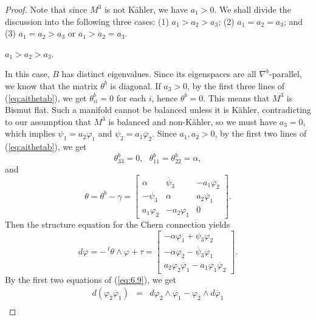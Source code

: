 \documentclass{amsart}
\numberwithin{equation}{section}
\theoremstyle{definition}
\renewcommand{\1}{\mathds{1}}
\renewcommand{\>}{\rightarrow}
\begin{document}
\begin{proof}  Note that  since $M^3$ is not K\"ahler, we have $a_1>0$.
We shall divide the discussion into the following three cases: (1) $a_1>a_2>a_3$; (2) $a_1=a_2=a_3$; and (3) $a_1=a_2>a_3$ or $a_1>a_2=a_3$.

\vspace{0.15cm}

 $a_1>a_2>a_3$.

\vspace{0.1cm}

In this case, $B$ has distinct eigenvalues. Since its eigenspaces are all $\nabla^b$-parallel, we know that the matrix $\theta^b$ is diagonal.
If $a_3>0$, by the first three lines of (\ref{eq:aithetab}), we get $\theta^b_{ii}=0$ for each $i$, hence $\theta^b=0$. This means that $M^3$ is Bismut flat. Such a manifold cannot be balanced unless it is K\"ahler, contradicting to our assumption that $M^3$ is balanced and non-K\"ahler, so we must have $a_3=0$, which implies $\psi_1=a_2\varphi_1$ and $\psi_2=a_1\overline{\varphi}_2$. Since $a_1, a_2>0$, by the first two lines of (\ref{eq:aithetab}), we get
\begin{equation*}
 \theta^b_{33}=0, \ \ \  \theta^b_{11}=\theta^b_{22} = \alpha ,
\end{equation*}
and
$$ \theta = \theta^b-\gamma =  \begin{bmatrix} \alpha  & \overline{\psi}_3 & -a_1\overline{\varphi}_2 \\ -\psi_3 & \alpha & a_2 \overline{\varphi}_1 \\ a_1\varphi_2 & -a_2\varphi_1 & 0 \end{bmatrix}\!\!. $$
Then the structure equation for the Chern connection yields
\begin{equation}
 d\varphi  =  -\,^t\!\theta \wedge \varphi + \tau = \begin{bmatrix} -\alpha \varphi_1 + \psi_3 \varphi_2 \\ - \alpha \varphi_2 - \overline{\psi}_3 \varphi_1  \\ a_2 \varphi_2 \overline{\varphi}_1 - a_1 \varphi_1 \overline{\varphi}_2   \end{bmatrix} \!\!. \label{eq:6.9}
 \end{equation}
By the first two equations of (\ref{eq:6.9}), we get
\begin{eqnarray*}
 d(\varphi_2 \overline{\varphi}_1 ) &  = & d\varphi_2 \wedge \overline{\varphi}_1 - \varphi_2 \wedge d\overline{\varphi}_1  \\

\end{eqnarray*}
\end{proof}
\end{document}
